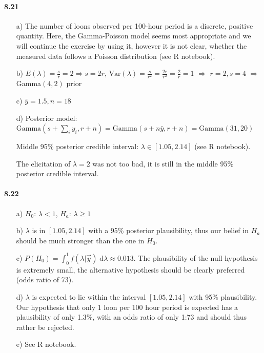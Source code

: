 \documentclass[fontsize=11pt,DIV=18,parskip=half]{scrartcl}
\begin{document}
\paragraph{8.21}

\begin{enumerate}
\item[a)] The number of loons observed per 100-hour period is a discrete, positive quantity. Here, the Gamma-Poisson model seems most appropriate and we will continue the exercise by using it, however it is not clear, whether the measured data follows a Poisson distribution (see R notebook).
\item[b)] $E(\lambda) = \frac{s}{r} = 2 \Rightarrow s=2r$, $\text{Var}(\lambda) = \frac{s}{r^2} = \frac{2r}{r^2} = \frac{2}{r} = 1$ \quad $\Rightarrow$ \quad $r=2, s=4$ \quad $\Rightarrow$ \quad Gamma$(4, 2)$ prior
\item[c)] $\bar{y} = 1.5, n=18$
\item[d)] Posterior model: $\text{Gamma}\left(s+\sum_i y_i, r+n\right) = \text{Gamma}\left(s+n \bar{y}, r+n\right) = \text{Gamma}\left(31, 20\right)$

Middle 95\% posterior credible interval:  $\lambda \in [1.05,2.14]$ (see R notebook).

The elicitation of $\lambda=2$ was not too bad, it is still in the middle 95\% posterior credible interval.
\end{enumerate}

\paragraph{8.22}

\begin{enumerate}
\item[a)] $H_0$: $\lambda < 1$, $H_a$: $\lambda \geq 1$
\item[b)] $\lambda$ is in $[1.05,2.14]$ with a 95\% posterior plausibility, thus our belief in $H_a$ should be much stronger than the one in $H_0$.
\item[c)] $P(H_0) = \int_0^1 f(\lambda|\vec{y}) \; \text{d}\lambda \approx 0.013$. The plausibility of the null hypothesis is extremely small, the alternative hypothesis should be clearly preferred (odds ratio of 73).
\item[d)] $\lambda$ is expected to lie within the interval $[1.05,2.14]$ with 95\% plausibility. Our hypothesis that only $1$ loon per 100 hour period is expected has a plausibility of only 1.3\%, with an odds ratio of only 1:73 and should thus rather be rejected.
\item[e)] See R notebook.
\end{enumerate}
\end{document}
